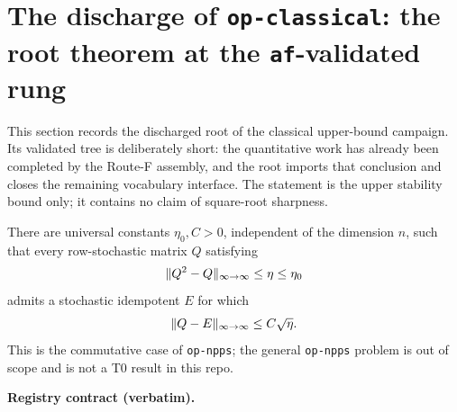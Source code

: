 \section{The discharge of \texttt{op-classical}: the root theorem at the \texttt{af}-validated rung}\label{sec:op-classical-discharge}

This section records the discharged root of the classical upper-bound campaign.  Its
validated tree is deliberately short: the quantitative work has already been completed by
the Route-F assembly, and the root imports that conclusion and closes the remaining
vocabulary interface.  The statement is the upper stability bound only; it contains no
claim of square-root sharpness.

\begin{theorem}\label{op:classical}
There are universal constants $\eta_{0},C>0$, independent of the dimension $n$, such that
every row-stochastic matrix $Q$ satisfying
\begin{equation}
  \lVert Q^{2}-Q \rVert_{\infty\to\infty}\le \eta\le \eta_{0}
\end{equation}
admits a stochastic idempotent $E$ for which
\begin{equation}
  \lVert Q-E \rVert_{\infty\to\infty}\le C\sqrt{\eta}.
\end{equation}
This is the commutative case of \texttt{op-npps}; the general \texttt{op-npps} problem is out of scope and is not a T0 result in this repo.
\end{theorem}

\noindent\textbf{Registry contract (verbatim).}

